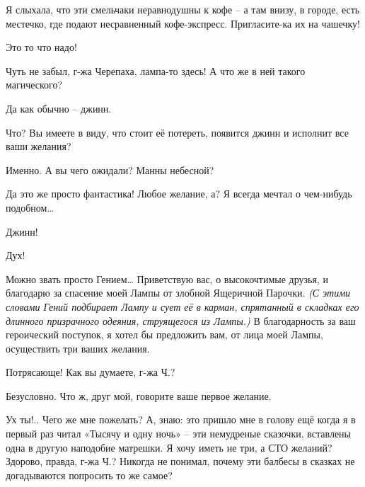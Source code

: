 \documentclass[../main.tex]{subfiles}
\begin{document}
\begin{Dialogue}
\begin{sublevel}
\begin{sublevel}
 Я слыхала, что эти смельчаки неравнодушны к кофе \--- а там внизу, в городе, есть местечко, где подают несравненный кофе-экспресс. Пригласите-ка их на чашечку!

 Это то что надо!


 Чуть не забыл, г-жа Черепаха, лампа-то здесь! А что же в ней такого магического?

 Да как обычно \--- джинн.

 Что? Вы имеете в виду, что стоит её потереть, появится джинн и исполнит все ваши желания?

 Именно. А вы чего ожидали? Манны небесной?

 Да это же просто фантастика! Любое желание, а? Я всегда мечтал о чем-нибудь подобном\ldots{}


 Джинн!

 Дух!

 Можно звать просто Гением\ldots{} Приветствую вас, о высокочтимые друзья, и благодарю за спасение моей Лампы от злобной Ящеричной Парочки. \emph{(С этими словами Гений подбирает Лампу и сует её в карман, спрятанный в складках его длинного призрачного одеяния, струящегося из Лампы.)} В благодарность за ваш героический поступок, я хотел бы предложить вам, от лица моей Лампы, осуществить три ваших желания.

 Потрясающе! Как вы думаете, г-жа Ч.\@?

 Безусловно. Что ж, друг мой, говорите ваше первое желание.

 Ух ты!.. Чего же мне пожелать? А, знаю: это пришло мне в голову ещё когда я в первый раз читал «Тысячу и одну ночь» \--- эти немудреные сказочки, вставлены одна в другую наподобие матрешки. Я хочу иметь не три, а СТО желаний? Здорово, правда, г-жа Ч.\@? Никогда не понимал, почему эти балбесы в сказках не догадываются попросить то же самое?


\end{sublevel}
\end{sublevel}
\end{Dialogue}
\end{document}
